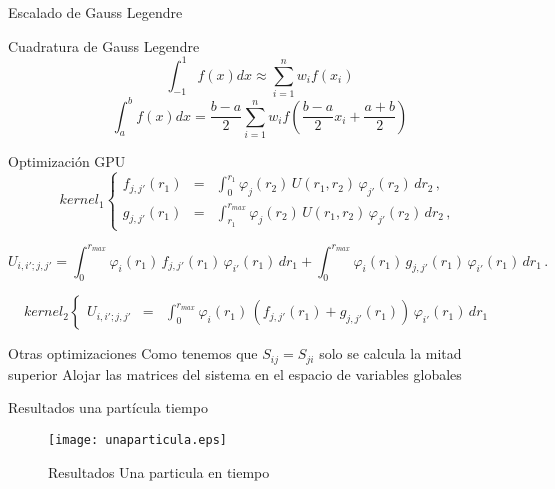 \documentclass{beamer}
\begin{document}
\begin{frame}{Escalado de Gauss Legendre}{}
  \begin{block}{Cuadratura de Gauss Legendre}
    \begin{displaymath}
      \int_{-1}^{1} f(x) dx \approx \sum_{i=1}^{n}w_if(x_i)
    \end{displaymath}
    \begin{displaymath}
      \int_{a}^{b} f(x) dx = \frac{b-a}{2} \sum_{i=1}^{n}w_if(\frac{b-a}{2}x_i + \frac{a+b}{2})
    \end{displaymath}
  \end{block}
\end{frame}


\begin{frame}{Optimizaci\'on GPU}{}
  \begin{displaymath}
  kernel_1 \left\lbrace \begin{array}{ccc}
    f_{j,j'}(r_1) &=& \int_0^{r_1} \varphi_j(r_2)\,U(r_1,r_2)\,\varphi_{j'}(r_2)\,dr_2 \,, \\
    g_{j,j'}(r_1) &=& \int_{r_1}^{r_{max}} \varphi_j(r_2)\,U(r_1,r_2)\,\varphi_{j'}(r_2)\,dr_2 \,,
  \end{array} \right.\,
  \end{displaymath}

  \begin{displaymath}
    U_{i,i';j,j'} = \int_0^{r_{max}} \varphi_i(r_1)\,f_{j,j'}(r_1)\,\varphi_{i'}(r_1)\,dr_1 + 
                    \int_0^{r_{max}} \varphi_i(r_1)\,g_{j,j'}(r_1)\,\varphi_{i'}(r_1)\,dr_1\,.
  \end{displaymath}

  \begin{displaymath}
    kernel_2 \left\lbrace \begin{array}{ccc}
    U_{i,i';j,j'} &=& \int_0^{r_{max}} \varphi_i(r_1)\,(f_{j,j'}(r_1) + g_{j,j'}(r_1))\,\varphi_{i'}(r_1)\,dr_1
    \end{array} \right.\,
  \end{displaymath}

\end{frame}

\begin{frame}{Otras optimizaciones}{}
  Como tenemos que $S_{ij} = S_{ji}$ solo se calcula la mitad superior
  Alojar las matrices del sistema en el espacio de variables globales
\end{frame}



\begin{frame}{Resultados una part\'icula tiempo}{}
  \begin{figure}[!tbp]
    \texttt{[image: unaparticula.eps]}
    \caption{Resultados Una particula en tiempo}
  \end{figure}
\end{frame}
\end{document}
